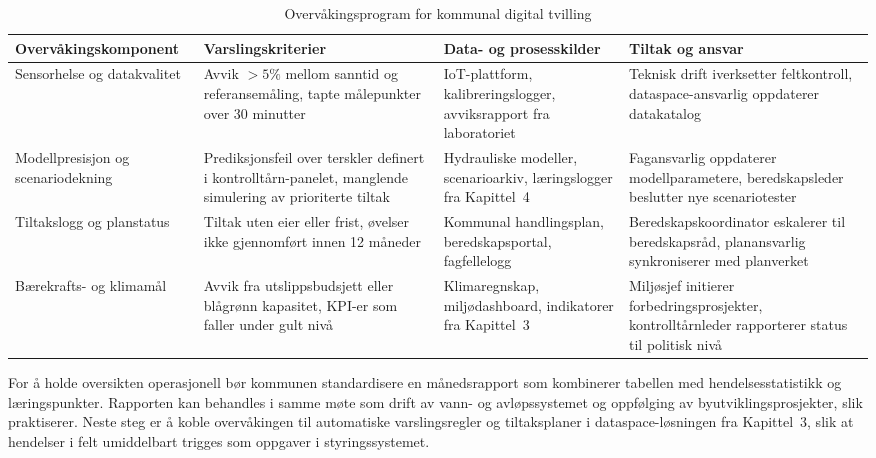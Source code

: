 \begin{table}[ht]
    \centering
    \caption{Overvåkingsprogram for kommunal digital tvilling}
    \label{tab:kommunal-overvaking}
    \begin{tabular}{|p{3.2cm}|p{4.6cm}|p{4.6cm}|p{3.0cm}|}
        \hline
        \textbf{Overvåkingskomponent} & \textbf{Varslingskriterier} & \textbf{Data- og prosesskilder} & \textbf{Tiltak og ansvar} \\
        \hline
        Sensorhelse og datakvalitet & Avvik \(>5\%\) mellom sanntid og referansemåling, tapte målepunkter over 30 minutter & IoT-plattform, kalibreringslogger, avviksrapport fra laboratoriet & Teknisk drift iverksetter feltkontroll, dataspace-ansvarlig oppdaterer datakatalog \\
        \hline
        Modellpresisjon og scenariodekning & Prediksjonsfeil over terskler definert i kontrolltårn-panelet, manglende simulering av prioriterte tiltak & Hydrauliske modeller, scenarioarkiv, læringslogger fra Kapittel~4 & Fagansvarlig oppdaterer modellparametere, beredskapsleder beslutter nye scenariotester \\
        \hline
        Tiltakslogg og planstatus & Tiltak uten eier eller frist, øvelser ikke gjennomført innen 12 måneder & Kommunal handlingsplan, beredskapsportal, fagfellelogg & Beredskapskoordinator eskalerer til beredskapsråd, planansvarlig synkroniserer med planverket \\
        \hline
        Bærekrafts- og klimamål & Avvik fra utslippsbudsjett eller blågrønn kapasitet, KPI-er som faller under gult nivå & Klimaregnskap, miljødashboard, indikatorer fra Kapittel~3 & Miljøsjef initierer forbedringsprosjekter, kontrolltårnleder rapporterer status til politisk nivå \\
        \hline
    \end{tabular}
\end{table}

For å holde oversikten operasjonell bør kommunen standardisere en månedsrapport som kombinerer tabellen med hendelsesstatistikk og læringspunkter. Rapporten kan behandles i samme møte som drift av vann- og avløpssystemet og oppfølging av byutviklingsprosjekter, slik \citet{oslo2023overvann} praktiserer. Neste steg er å koble overvåkingen til automatiske varslingsregler og tiltaksplaner i dataspace-løsningen fra Kapittel~3, slik at hendelser i felt umiddelbart trigges som oppgaver i styringssystemet.

